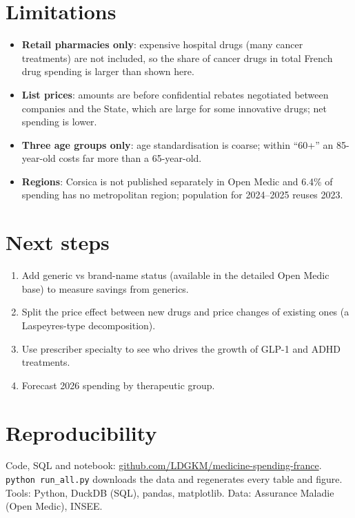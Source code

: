 \documentclass[11pt,a4paper]{article}
\begin{document}
\section{Limitations}
\begin{itemize}
  \item \textbf{Retail pharmacies only}: expensive hospital drugs (many cancer treatments) are not included, so the share of
        cancer drugs in total French drug spending is larger than shown here.
  \item \textbf{List prices}: amounts are before confidential rebates negotiated between companies and the State, which
        are large for some innovative drugs; net spending is lower.
  \item \textbf{Three age groups only}: age standardisation is coarse; within ``60+'' an 85-year-old costs far more than a
        65-year-old.
  \item \textbf{Regions}: Corsica is not published separately in Open Medic and 6.4\% of spending has no metropolitan
        region; population for 2024--2025 reuses 2023.
\end{itemize}

\section{Next steps}
\begin{enumerate}
  \item Add generic vs brand-name status (available in the detailed Open Medic base) to measure savings from generics.
  \item Split the price effect between new drugs and price changes of existing ones (a Laspeyres-type decomposition).
  \item Use prescriber specialty to see who drives the growth of GLP-1 and ADHD treatments.
  \item Forecast 2026 spending by therapeutic group.
\end{enumerate}

\section*{Reproducibility}
Code, SQL and notebook: \href{https://github.com/LDGKM/medicine-spending-france}{github.com/LDGKM/medicine-spending-france}.
\texttt{python run\_all.py} downloads the data and regenerates every table and figure.
Tools: Python, DuckDB (SQL), pandas, matplotlib. Data: Assurance Maladie (Open Medic), INSEE.
\end{document}
